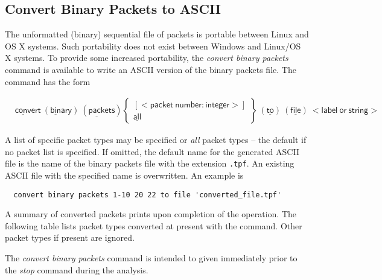 \documentclass[11pt]{report}
\numberwithin{equation}{section}
\newcommand{\nin} {\noindent}
\newcommand{\ul} {\underline}
\newcommand{\hv} {\mathsf}   %
\newcommand{\ti}{\emph}
\begin{document}
\subsection{Convert Binary Packets to ASCII}
\nin The unformatted (binary) sequential file of packets is portable between Linux and OS X systems. 
Such portability does not exist between Windows  and  Linux/OS X systems. To provide some
increased portability, the \ti{convert binary packets} command is available to write an ASCII version of the
binary packets file. The command has the form

\small
\begin{align*}
& \hv{\ul{conv}ert\ (\ul{bin}ary)\  (\ul{pack}ets) }
\begin{Bmatrix}
\hv{[<packet\ number:integer>]} \\ \hv{\ul{all}} 
\end{Bmatrix} 
 \ \hv{(\ul{to})}\ \hv{(\ul{file})}\ \hv{<label\ or\ string>}
\end{align*}
\normalsize

\nin A list of specific packet types may be specified or \ti{all} packet types -- the default if no packet list
is specified. If omitted, the default name for the generated ASCII file is the name of the binary packets
file with the extension \texttt{.tpf}. An existing ASCII file with the specified name is overwritten.  An example is
\small
\begin{verbatim}
  convert binary packets 1-10 20 22 to file 'converted_file.tpf'
\end{verbatim}
\normalsize

\nin A summary of 
converted packets prints upon completion of the operation.  The following table lists packet types
converted at present with the command. Other packet types if present are ignored.

The \ti{convert binary packets} command
is intended to given immediately prior to the \ti{stop} command during the analysis. 
\end{document}
